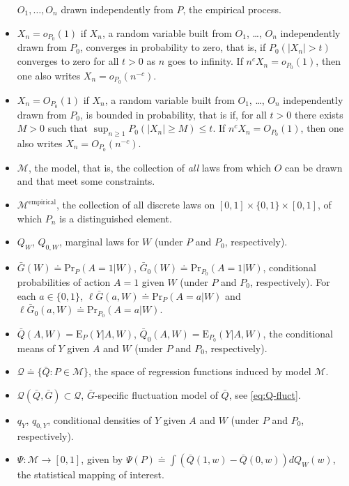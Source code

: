 \documentclass[
  11pt,
  openright,twoside]{book}
\newcommand{\defq}{\doteq}
\newcommand{\calM}{\mathcal{M}}
\newcommand{\calQ}{\mathcal{Q}}
\newcommand{\Exp}{\textrm{E}}
\newcommand{\Gbar}{\bar{G}}
\renewcommand{\Pr}{\textrm{Pr}}
\newcommand{\Qbar}{\bar{Q}}
\theoremstyle{definition}
\theoremstyle{definition}
\theoremstyle{definition}
\theoremstyle{definition}
\theoremstyle{remark}
\begin{document}
\begin{itemize}
  \(O_{1}, \ldots, O_{n}\) drawn independently from \(P\), the empirical process.
\item
  \(X_n = o_{P_0}(1)\) if \(X_n\), a random variable built from \(O_{1}\), \ldots,
  \(O_{n}\) independently drawn from \(P_0\), converges in probability to zero, that
  is, if \(P_0(|X_n| > t)\) converges to zero for all \(t>0\) as \(n\) goes to
  infinity. If \(n^{c} X_n = o_{P_0}(1)\), then one also writes \(X_n = o_{P_0}(n^{-c})\).
\item
  \(X_{n} = O_{P_0}(1)\) if \(X_n\), a random variable built from \(O_{1}\), \ldots,
  \(O_{n}\) independently drawn from \(P_0\), is bounded in probability, that
  is if, for all \(t>0\) there exists \(M >0\) such that \(\sup_{n \geq 1} P_0(|X_n| \geq M) \leq t\). If \(n^{c} X_n = O_{P_0}(1)\), then one also writes \(X_n = O_{P_0}(n^{-c})\).
\item
  \(\calM\), the model, that is, the collection of \emph{all} laws from which \(O\)
  can be drawn and that meet some constraints.
\item
  \(\calM^{\text{empirical}}\), the collection of all discrete laws on \([0,1] \times \{0,1\} \times [0,1]\), of which \(P_{n}\) is a distinguished element.
\item
  \(Q_{W}\), \(Q_{0,W}\), marginal laws for \(W\) (under \(P\) and \(P_{0}\),
  respectively).
\item
  \(\Gbar(W) \defq \Pr_{P}(A = 1 | W)\), \(\Gbar_0(W) \defq \Pr_{P_0}(A = 1 | W)\), conditional probabilities of action \(A = 1\) given \(W\) (under \(P\) and
  \(P_{0}\), respectively). For each \(a \in \{0,1\}\), \(\ell\Gbar(a,W) \defq \Pr_{P}(A = a | W)\) and \(\ell\Gbar_0(a,W) \defq \Pr_{P_0}(A = a | W)\).
\item
  \(\Qbar(A,W) = \Exp_{P}(Y|A,W)\), \(\Qbar_0(A,W) = \Exp_{P_{0}}(Y|A,W)\), the
  conditional means of \(Y\) given \(A\) and \(W\) (under \(P\) and \(P_{0}\),
  respectively).
\item
  \(\calQ \defq \{\Qbar : P \in \calM\}\), the space of regression
  functions induced by model \(\calM\).
\item
  \(\calQ(\Qbar,\Gbar) \subset \calQ\), \(\Gbar\)-specific fluctuation model of
  \(\Qbar\), see \eqref{eq:Q-fluct}.
\item
  \(q_{Y}\), \(q_{0,Y}\), conditional densities of \(Y\) given \(A\) and \(W\) (under
  \(P\) and \(P_{0}\), respectively).
\item
  \(\Psi : \calM \to [0,1]\), given by \(\Psi(P) \defq \int \left(\Qbar(1, w) - \Qbar(0, w)\right)dQ_{W}(w)\), the statistical mapping of interest.

\end{itemize}
\end{document}
